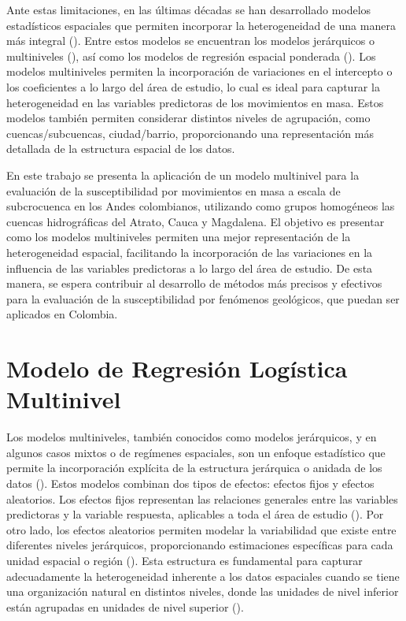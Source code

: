 \documentclass[
  manuscript=article,  
  layout=preprint,  
]{format}
\begin{document}
Ante estas limitaciones, en las últimas décadas se han desarrollado modelos estadísticos espaciales que permiten incorporar la heterogeneidad de una manera más integral (\cite{anselin1988spatial, anselin2022spatial, lesage2009introduction, cressie2015statistics}). Entre estos modelos se encuentran los modelos jerárquicos o multiniveles (\cite{kumar2011hierarchical}), así como los modelos de regresión espacial ponderada (\cite{fotheringham2009geographically}). Los modelos multiniveles permiten la incorporación de variaciones en el intercepto o los coeficientes a lo largo del área de estudio, lo cual es ideal para capturar la heterogeneidad en las variables predictoras de los movimientos en masa. Estos modelos también permiten considerar distintos niveles de agrupación, como cuencas/subcuencas, ciudad/barrio, proporcionando una representación más detallada de la estructura espacial de los datos.

En este trabajo se presenta la aplicación de un modelo multinivel para la evaluación de la susceptibilidad por movimientos en masa a escala de subcrocuenca en los Andes colombianos, utilizando como grupos homogéneos las cuencas hidrográficas del Atrato, Cauca y Magdalena. El objetivo es presentar como los modelos multiniveles permiten una mejor representación de la heterogeneidad espacial, facilitando la incorporación de las variaciones en la influencia de las variables predictoras a lo largo del área de estudio. De esta manera, se espera contribuir al desarrollo de métodos más precisos y efectivos para la evaluación de la susceptibilidad por fenómenos geológicos, que puedan ser aplicados en Colombia.

\section{Modelo de Regresión Logística Multinivel}

Los modelos multiniveles, también conocidos como modelos jerárquicos, y en algunos casos mixtos o de regímenes espaciales, son un enfoque estadístico que permite la incorporación explícita de la estructura jerárquica o anidada de los datos (\cite{lee1996hierarchical}). Estos modelos combinan dos tipos de efectos: efectos fijos y efectos aleatorios. Los efectos fijos representan las relaciones generales entre las variables predictoras y la variable respuesta, aplicables a toda el área de estudio (\cite{kumar2011hierarchical}). Por otro lado, los efectos aleatorios permiten modelar la variabilidad que existe entre diferentes niveles jerárquicos, proporcionando estimaciones específicas para cada unidad espacial o región (\cite{kumar2011hierarchical}). Esta estructura es fundamental para capturar adecuadamente la heterogeneidad inherente a los datos espaciales cuando se tiene una organización natural en distintos niveles, donde las unidades de nivel inferior están agrupadas en unidades de nivel superior (\cite{wong1985hierarchical}). 
\end{document}
